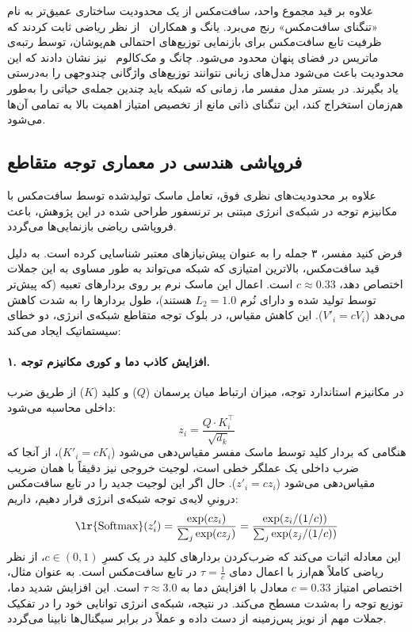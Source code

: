 علاوه بر قید مجموع واحد، سافت‌مکس از یک محدودیت ساختاری عمیق‌تر به نام «تنگنای سافت‌مکس» رنج می‌برد. یانگ و همکاران~\cite{yang2018breaking} از نظر ریاضی ثابت کردند که ظرفیت تابع سافت‌مکس برای بازنمایی توزیع‌های احتمالی هم‌پوشان، توسط رتبه‌ی ماتریس در فضای پنهان محدود می‌شود. چانگ و مک‌کالوم~\cite{chang2022softmax} نیز نشان دادند که این محدودیت باعث می‌شود مدل‌های زبانی نتوانند توزیع‌های واژگانی چندوجهی را به‌درستی یاد بگیرند. در بستر مدل مفسر ما، زمانی که شبکه باید چندین جمله‌ی حیاتی را به‌طور هم‌زمان استخراج کند، این تنگنای ذاتی مانع از تخصیص امتیاز اهمیت بالا به تمامی آن‌ها می‌شود.


\subsection{فروپاشی هندسی در معماری توجه متقاطع}

علاوه بر محدودیت‌های نظری فوق، تعامل ماسک تولیدشده توسط سافت‌مکس با مکانیزم توجه در شبکه‌ی انرژی مبتنی بر ترنسفور طراحی شده در این پژوهش، باعث فروپاشی ریاضی بازنمایی‌ها می‌گردد. 

فرض کنید مفسر، ۳ جمله را به عنوان پیش‌نیازهای معتبر شناسایی کرده است. به دلیل قید سافت‌مکس، بالاترین امتیازی که شبکه می‌تواند به طور مساوی به این جملات اختصاص دهد، $c \approx 0.33$ است. اعمال این ماسک نرم بر روی بردارهای تعبیه (که پیش‌تر توسط  تولید شده و دارای نُرم $L_2 = 1.0$ هستند)، طول بردارها را به شدت کاهش می‌دهد ($V'_i = c V_i$). این کاهش مقیاس، در بلوک توجه متقاطع شبکه‌ی انرژی، دو خطای سیستماتیک ایجاد می‌کند:

\paragraph{۱. افزایش کاذب دما و کوری مکانیزم توجه.}
در مکانیزم استاندارد توجه، میزان ارتباط میان پرسمان ($Q$) و کلید ($K$) از طریق ضرب داخلی محاسبه می‌شود:
\begin{equation}
    z_i = \frac{Q \cdot K_i^\top}{\sqrt{d_k}}
\end{equation}
هنگامی که بردار کلید توسط ماسک مفسر مقیاس‌دهی می‌شود ($K'_i = c K_i$)، از آنجا که ضرب داخلی یک عملگر خطی است، لوجیت خروجی نیز دقیقاً با همان ضریب مقیاس‌دهی می‌شود ($z'_i = c z_i$). حال اگر این لوجیت جدید را در تابع سافت‌مکس درونیِ لایه‌ی توجه شبکه‌ی انرژی قرار دهیم، داریم:
\begin{equation}
    \text{\lr{Softmax}}(z'_i) = \frac{\exp(c z_i)}{\sum_j \exp(c z_j)} = \frac{\exp(z_i / (1/c))}{\sum_j \exp(z_j / (1/c))}
\end{equation}
این معادله اثبات می‌کند که ضرب‌کردن بردارهای کلید در یک کسرِ $c \in (0, 1)$، از نظر ریاضی کاملاً هم‌ارز با اعمال دمای $\tau = \frac{1}{c}$ در تابع سافت‌مکس است. به عنوان مثال، اختصاص امتیاز $c = 0.33$ معادل با افزایش دما به $\tau \approx 3.0$ است. این افزایش شدید دما، توزیع توجه را به‌شدت مسطح می‌کند. در نتیجه، شبکه‌ی انرژی توانایی خود را در تفکیک جملات مهم از نویز پس‌زمینه از دست داده و عملاً در برابر سیگنال‌ها نابینا می‌گردد.

